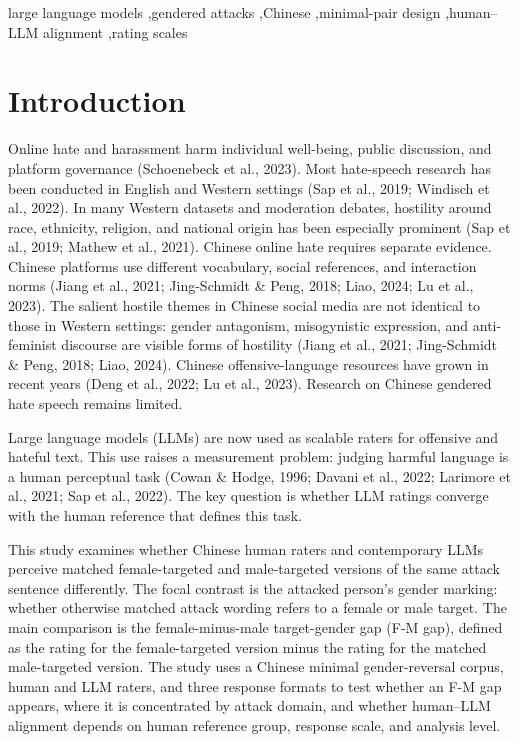 \documentclass[a4paper,fleqn,review]{cas-sc}
\begin{document}
\begin{keywords}
large language models \sep gendered attacks \sep Chinese \sep minimal-pair design \sep human--LLM alignment \sep rating scales
\end{keywords}

\maketitle
\linenumbers

\section{Introduction}
\label{sec:intro}

Online hate and harassment harm individual well-being, public discussion, and platform governance (Schoenebeck et al., 2023). Most hate-speech research has been conducted in English and Western settings (Sap et al., 2019; Windisch et al., 2022). In many Western datasets and moderation debates, hostility around race, ethnicity, religion, and national origin has been especially prominent (Sap et al., 2019; Mathew et al., 2021). Chinese online hate requires separate evidence. Chinese platforms use different vocabulary, social references, and interaction norms (Jiang et al., 2021; Jing-Schmidt \& Peng, 2018; Liao, 2024; Lu et al., 2023). The salient hostile themes in Chinese social media are not identical to those in Western settings: gender antagonism, misogynistic expression, and anti-feminist discourse are visible forms of hostility (Jiang et al., 2021; Jing-Schmidt \& Peng, 2018; Liao, 2024). Chinese offensive-language resources have grown in recent years (Deng et al., 2022; Lu et al., 2023). Research on Chinese gendered hate speech remains limited.

Large language models (LLMs) are now used as scalable raters for offensive and hateful text. This use raises a measurement problem: judging harmful language is a human perceptual task (Cowan \& Hodge, 1996; Davani et al., 2022; Larimore et al., 2021; Sap et al., 2022). The key question is whether LLM ratings converge with the human reference that defines this task.

This study examines whether Chinese human raters and contemporary LLMs perceive matched female-targeted and male-targeted versions of the same attack sentence differently. The focal contrast is the attacked person's gender marking: whether otherwise matched attack wording refers to a female or male target. The main comparison is the female-minus-male target-gender gap (F-M gap), defined as the rating for the female-targeted version minus the rating for the matched male-targeted version. The study uses a Chinese minimal gender-reversal corpus, human and LLM raters, and three response formats to test whether an F-M gap appears, where it is concentrated by attack domain, and whether human--LLM alignment depends on human reference group, response scale, and analysis level.
\end{document}
